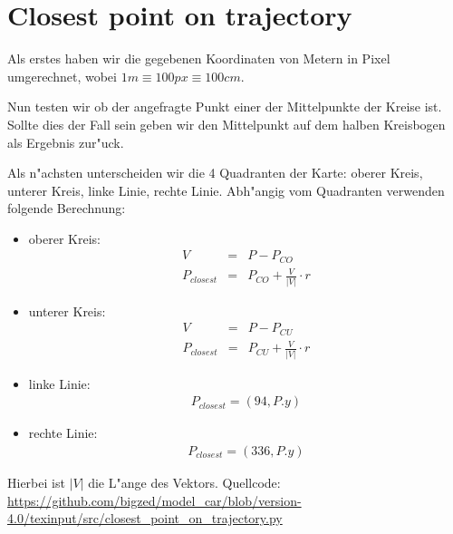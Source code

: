 \documentclass[10pt,oneside,a4paper]{article}
\begin{document}
  \section{Closest point on trajectory}
    Als erstes haben wir die gegebenen Koordinaten von Metern in Pixel umgerechnet, wobei \( 1m
    \equiv 100px \equiv 100cm \).

    Nun testen wir ob der angefragte Punkt einer der Mittelpunkte der Kreise ist. Sollte dies der
    Fall sein geben wir den Mittelpunkt auf dem halben Kreisbogen als Ergebnis zur"uck.

    Als n"achsten unterscheiden wir die 4 Quadranten der Karte: oberer Kreis, unterer Kreis, linke
    Linie, rechte Linie. Abh"angig vom Quadranten verwenden folgende Berechnung:
    \begin{itemize}
      \item{oberer Kreis:}
        \begin{eqnarray*}
          V & = & P - P_{CO} \\
          P_{closest} & = & P_{CO} + \frac{V}{|V|} \cdot r
        \end{eqnarray*}
      \item{unterer Kreis:}
        \begin{eqnarray*}
          V & = & P - P_{CU}\\
          P_{closest} & = & P_{CU} + \frac{V}{|V|} \cdot r
        \end{eqnarray*}
      \item{linke Linie:}
        \begin{eqnarray*}
          P_{closest} = (94, P.y)
        \end{eqnarray*}
      \item{rechte Linie:}
        \begin{eqnarray*}
          P_{closest} = (336, P.y)
        \end{eqnarray*}
    \end{itemize}
    Hierbei ist \( |V| \) die L"ange des Vektors. Quellcode:
    \url{https://github.com/bigzed/model_car/blob/version-4.0/texinput/src/closest_point_on_trajectory.py}
\end{document}
